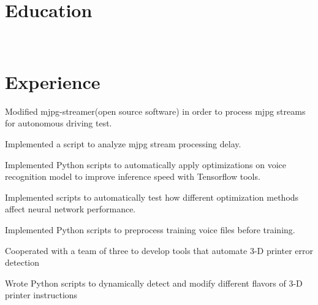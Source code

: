 \documentclass[]{deedy-resume-openfont}
\begin{document}
    
%
%
%
%
\section{Education}
\raggedright

\hfill {}\\

\sectionsep
%
%
\section{Experience}
\hfill {}
\begin{tightemize}
	\item Modified mjpg-streamer(open source software) in order to process mjpg streams for autonomous driving test.
	\item Implemented a script to analyze mjpg stream processing delay.
\end{tightemize}
\sectionsep

\hfill {}
\begin{tightemize}
	\item Implemented Python scripts to automatically apply optimizations on voice recognition model to improve inference speed with Tensorflow tools.
	\item Implemented scripts to automatically test how different optimization methods affect neural network performance.
	\item Implemented Python scripts to preprocess training voice files before training.
\end{tightemize}
\sectionsep

\hfill {}
\begin{tightemize}
	\item Cooperated with a team of three to develop tools that automate 3-D printer error detection
	\item Wrote Python scripts to dynamically detect and modify different flavors of 3-D printer instructions
	

\end{tightemize}
\end{document}
